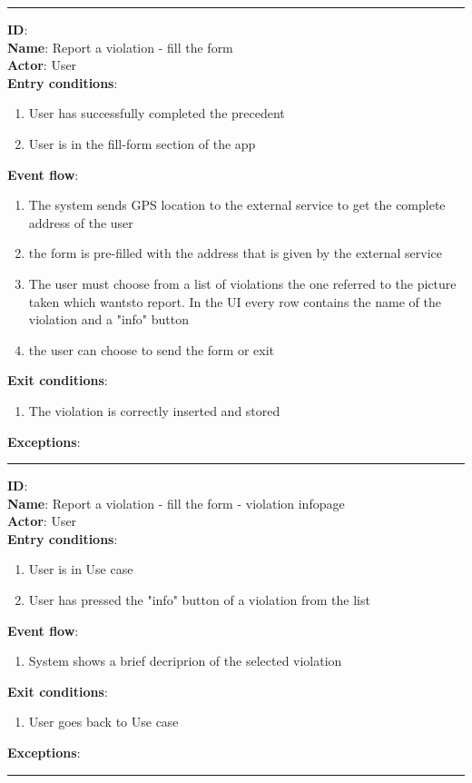   \rule{\linewidth}{0.4pt}
  \textbf{ID}:  \\
  \textbf{Name}: Report a violation - fill the form \\
  \textbf{Actor}: User   \\
  \textbf{Entry conditions}:
  \begin{enumerate}
    \item{User has successfully completed the precedent }
    \item{User is in the fill-form section of the app}
  \end{enumerate}
  \textbf{Event flow}:
  \begin{enumerate}
    \item{The system sends GPS location to the external service to get the complete address of the user}
    \item{the form is pre-filled with the address that is given by the external service  }
    \item{The user must choose from a list of violations the one referred to the picture taken which wantsto report. In the UI every row contains the name of the violation and a "info" button}
    \item{the user can choose to send the form or exit}
  \end{enumerate}
  \textbf{Exit conditions}:
  \begin{enumerate}
    \item{The violation is correctly inserted and stored}
  \end{enumerate}
  \textbf{Exceptions}:
  \begin{enumerate}
  \end{enumerate}
  \rule{\linewidth}{0.4pt}
  \textbf{ID}:  \\
  \textbf{Name}: Report a violation - fill the form - violation infopage \\
  \textbf{Actor}: User   \\
  \textbf{Entry conditions}:
  \begin{enumerate}
    \item{User is in Use case  }
    \item{User has pressed the "info" button of a violation from the list }
  \end{enumerate}
  \textbf{Event flow}:
  \begin{enumerate}
    \item{System shows a brief decriprion of the selected violation}
  \end{enumerate}
  \textbf{Exit conditions}:
  \begin{enumerate}
    \item{User goes back to Use case }
  \end{enumerate}
  \textbf{Exceptions}:
  \begin{enumerate}
  \end{enumerate}
  \rule{\linewidth}{0.4pt}



